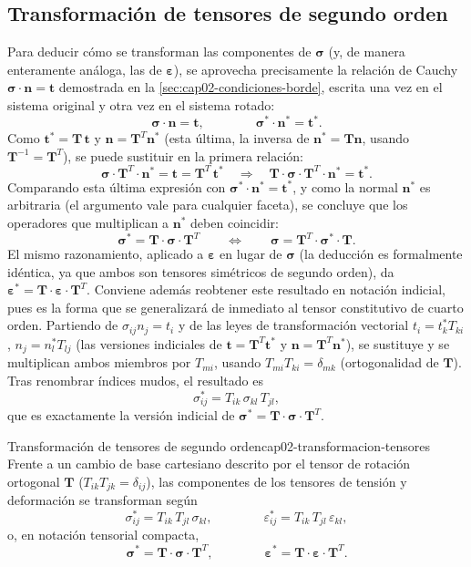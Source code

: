 \subsection{Transformación de tensores de segundo orden}

Para deducir cómo se transforman las componentes de $\bm\sigma$ (y, de manera enteramente análoga, las de $\bm\varepsilon$), se aprovecha precisamente la relación de Cauchy $\bm\sigma\cdot\bm n=\bm t$ demostrada en la \cref{sec:cap02-condiciones-borde}, escrita una vez en el sistema original y otra vez en el sistema rotado:
\[
\bm\sigma\cdot\bm n = \bm t, \qquad\qquad \bm\sigma^{*}\cdot\bm n^{*} = \bm t^{*}.
\]
Como $\bm t^{*}=\bm T\,\bm t$ y $\bm n=\bm T^{T}\bm n^{*}$ (esta última, la inversa de $\bm n^*=\bm T\bm n$, usando $\bm T^{-1}=\bm T^T$), se puede sustituir en la primera relación:
\[
\bm\sigma\cdot\bm T^{T}\cdot\bm n^{*} = \bm t = \bm T^{T}\,\bm t^{*} \quad\Longrightarrow\quad \bm T\cdot\bm\sigma\cdot\bm T^{T}\cdot\bm n^{*} = \bm t^{*}.
\]
Comparando esta última expresión con $\bm\sigma^{*}\cdot\bm n^{*}=\bm t^{*}$, y como la normal $\bm n^*$ es arbitraria (el argumento vale para cualquier faceta), se concluye que los operadores que multiplican a $\bm n^*$ deben coincidir:
\[
\bm\sigma^{*} = \bm T\cdot\bm\sigma\cdot\bm T^{T} \qquad \Longleftrightarrow \qquad \bm\sigma = \bm T^{T}\cdot\bm\sigma^{*}\cdot\bm T.
\]
El mismo razonamiento, aplicado a $\bm\varepsilon$ en lugar de $\bm\sigma$ (la deducción es formalmente idéntica, ya que ambos son tensores simétricos de segundo orden), da $\bm\varepsilon^{*}=\bm T\cdot\bm\varepsilon\cdot\bm T^{T}$. Conviene además reobtener este resultado en notación indicial, pues es la forma que se generalizará de inmediato al tensor constitutivo de cuarto orden. Partiendo de $\sigma_{ij}n_j=t_i$ y de las leyes de transformación vectorial $t_i=t^*_k T_{ki}$, $n_j=n^*_lT_{lj}$ (las versiones indiciales de $\bm t=\bm T^T\bm t^*$ y $\bm n=\bm T^T\bm n^*$), se sustituye y se multiplican ambos miembros por $T_{mi}$, usando $T_{mi}T_{ki}=\delta_{mk}$ (ortogonalidad de $\bm T$). Tras renombrar índices mudos, el resultado es
\[
\sigma^{*}_{ij} = T_{ik}\,\sigma_{kl}\,T_{jl},
\]
que es exactamente la versión indicial de $\bm\sigma^{*}=\bm T\cdot\bm\sigma\cdot\bm T^{T}$.

\begin{ecnimportante}{Transformación de tensores de segundo orden}{cap02-transformacion-tensores}
Frente a un cambio de base cartesiano descrito por el tensor de rotación ortogonal $\bm T$ ($T_{ik}T_{jk}=\delta_{ij}$), las componentes de los tensores de tensión y deformación se transforman según
\[
\sigma^{*}_{ij} = T_{ik}\,T_{jl}\,\sigma_{kl}, \qquad\qquad \varepsilon^{*}_{ij} = T_{ik}\,T_{jl}\,\varepsilon_{kl},
\]
o, en notación tensorial compacta,
\[
\bm\sigma^{*} = \bm T\cdot\bm\sigma\cdot\bm T^{T}, \qquad\qquad \bm\varepsilon^{*} = \bm T\cdot\bm\varepsilon\cdot\bm T^{T}.
\]
\end{ecnimportante}

